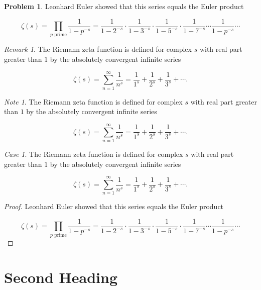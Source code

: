 \documentclass[english,oneside, article]{memoir}
\theoremstyle{plain}
\theoremstyle{definition}
\newtheorem{Problem}{Problem}[chapter]
\theoremstyle{remark}
\newtheorem{Case}{Case}[chapter]
\newtheorem*{Remark}{Remark}
\newtheorem*{Note}{Note}
\begin{document}
\begin{Problem}

Leonhard Euler showed that this series equals the Euler product

\[\zeta(s) = \prod_{p \text{ prime}} \frac{1}{1-p^{-s}}= \frac{1}{1-2^{-s}}\cdot\frac{1}{1-3^{-s}}\cdot\frac{1}{1-5^{-s}}\cdot\frac{1}{1-7^{-s}} \cdots \frac{1}{1-p^{-s}} \cdots\]

\end{Problem}

\begin{Remark}

The Riemann zeta function is defined for complex \(s\) with real part
greater than \(1\) by the absolutely convergent infinite series

\[\zeta(s) = \sum_{n=1}^\infty \frac{1}{n^s} = \frac{1}{1^s} + \frac{1}{2^s} + \frac{1}{3^s} + \cdots.\]

\end{Remark}

\begin{Note}

The Riemann zeta function is defined for complex \(s\) with real part
greater than \(1\) by the absolutely convergent infinite series

\[\zeta(s) = \sum_{n=1}^\infty \frac{1}{n^s} = \frac{1}{1^s} + \frac{1}{2^s} + \frac{1}{3^s} + \cdots.\]

\end{Note}

\begin{Case}

The Riemann zeta function is defined for complex \(s\) with real part
greater than \(1\) by the absolutely convergent infinite series

\[\zeta(s) = \sum_{n=1}^\infty \frac{1}{n^s} = \frac{1}{1^s} + \frac{1}{2^s} + \frac{1}{3^s} + \cdots.\]

\end{Case}

\begin{proof}

Leonhard Euler showed that this series equals the Euler product

\[\zeta(s) = \prod_{p \text{ prime}} \frac{1}{1-p^{-s}}= \frac{1}{1-2^{-s}}\cdot\frac{1}{1-3^{-s}}\cdot\frac{1}{1-5^{-s}}\cdot\frac{1}{1-7^{-s}} \cdots \frac{1}{1-p^{-s}} \cdots\]

\end{proof}

\chapter{Second Heading}\label{second-heading}
\end{document}
